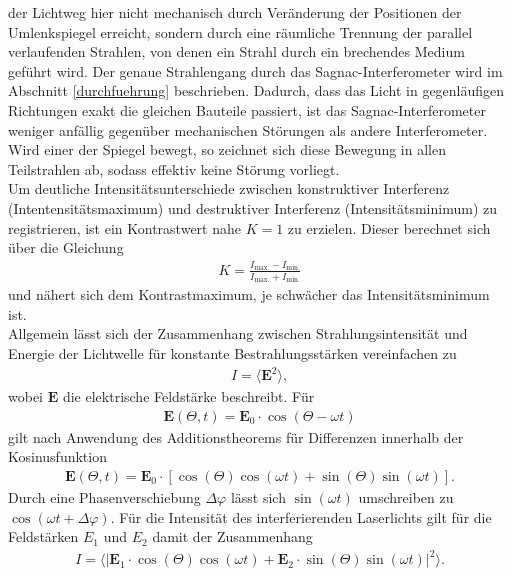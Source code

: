 der Lichtweg hier nicht mechanisch durch Veränderung der Positionen der
Umlenkspiegel erreicht, sondern durch eine räumliche Trennung der parallel
verlaufenden Strahlen, von denen ein Strahl durch ein brechendes Medium geführt
wird. Der genaue Strahlengang durch das Sagnac-Interferometer wird im Abschnitt
\ref{durchfuehrung} beschrieben. Dadurch, dass das Licht in gegenläufigen
Richtungen exakt die gleichen Bauteile passiert, ist das Sagnac-Interferometer
weniger anfällig gegenüber mechanischen Störungen als andere Interferometer. Wird
einer der Spiegel bewegt, so zeichnet sich diese Bewegung in allen Teilstrahlen
ab, sodass effektiv keine Störung vorliegt. \\
\noindent Um deutliche Intensitätsunterschiede zwischen konstruktiver Interferenz
(Intentensitätsmaximum) und destruktiver Interferenz (Intensitätsminimum) zu
registrieren, ist ein Kontrastwert nahe $K = 1$ zu erzielen. Dieser berechnet
sich über die Gleichung
\begin{align}
  K = \frac{I_\text{max.}- I_\text{min.}}{I_\text{max.} + I_\text{min.}}
  \label{eqn:01}
\end{align}
\noindent und nähert sich dem Kontrastmaximum, je schwächer das
Intensitätsminimum ist. \\
\noindent Allgemein lässt sich der Zusammenhang zwischen Strahlungsintensität
und Energie der Lichtwelle für konstante Bestrahlungsstärken vereinfachen zu
\begin{align}
  I = \langle \textbf{E}^2 \rangle,
  \label{eqn:02}
\end{align}
\noindent wobei $\textbf{E}$ die elektrische Feldstärke beschreibt. Für
\begin{align}
  \textbf{E}(\Theta, t) = \textbf{E}_0 \cdot \cos(\Theta - \omega t)
  \label{eqn:03}
\end{align}
\noindent gilt nach Anwendung des Additionstheorems für Differenzen innerhalb der
Kosinusfunktion
\begin{align}
  \textbf{E}(\Theta, t) = \textbf{E}_0 \cdot \left[\cos(\Theta) \cos(\omega t) + \sin(\Theta) \sin(\omega t) \right].
  \label{eqn:04}
\end{align}
\noindent Durch eine Phasenverschiebung $\Delta \varphi$ lässt sich
$\sin(\omega t)$ umschreiben zu $\cos(\omega t + \Delta \varphi)$. Für die Intensität
des interferierenden Laserlichts gilt für die Feldstärken $E_1$ und $E_2$ damit
der Zusammenhang
\begin{align}
  I = \langle | \textbf{E}_1 \cdot \cos(\Theta) \cos(\omega t) + \textbf{E}_2 \cdot \sin(\Theta) \sin(\omega t) |^2 \rangle.
  \label{eqn:05}
\end{align}
